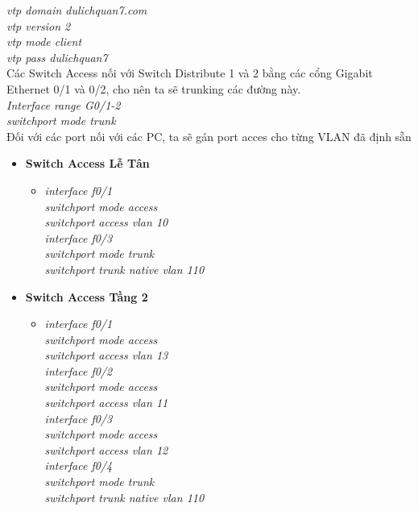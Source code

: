 \documentclass[a4paper, 12pt]{article}
\begin{document}
\begin{itemize}
\hspace*{2cm}\textit{vtp domain dulichquan7.com\\
\hspace*{2cm}vtp version 2\\
\hspace*{2cm}vtp mode client\\
\hspace*{2cm}vtp pass dulichquan7\\} 
\hspace*{1cm}Các Switch Access nối với Switch Distribute 1 và 2 bằng các cổng Gigabit Ethernet 0/1 và 0/2, cho nên ta sẽ trunking các đường này.\\
\hspace*{2cm}\textit{Interface range G0/1-2\\
\hspace*{2cm}switchport mode trunk\\}
\hspace*{1cm}Đối với các port nối với các PC, ta sẽ gán port acces cho từng VLAN đã định sẵn
  \begin{itemize}
    \item \textbf{Switch Access Lễ Tân}
    \begin{itemize}
      \item \textit{interface f0/1\\
                    switchport mode access\\
                    switchport access vlan 10\\
                    interface f0/3\\
                    switchport mode trunk\\
                    switchport trunk native vlan 110\\}   
      
    \end{itemize}
    \item \textbf{Switch Access Tầng 2}
     \begin{itemize}
      \item \textit{interface f0/1\\
                    switchport mode access\\
                    switchport access vlan 13\\
                    interface f0/2\\
                    switchport mode access\\
                    switchport access vlan 11\\
                    interface f0/3\\
                    switchport mode access\\
                    switchport access vlan 12\\
                    interface f0/4\\
                    switchport mode trunk\\
                    switchport trunk native vlan 110\\
                    }
     

\end{itemize}
\end{itemize}
\end{itemize}
\end{document}
